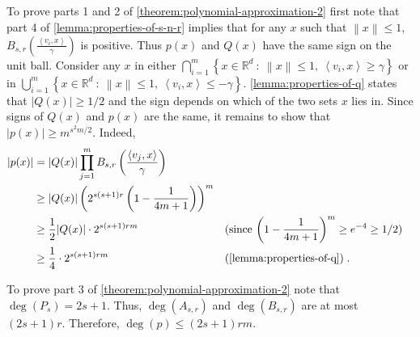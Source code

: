 \documentclass[12pt]{article}
\newcommand{\R}{\mathbb{R}}  %
\newcommand{\ip}[2]{\left\langle #1, #2 \right\rangle} %
\newcommand{\norm}[1]{\left\| #1 \right\|}  %
\begin{document}
To prove parts 1 and 2 of \autoref{theorem:polynomial-approximation-2} first
note that part 4 of \autoref{lemma:properties-of-s-n-r} implies that for any $x$
such that $\norm{x} \le 1$, $B_{s,r}\left( \frac{\ip{v_i}{x}}{\gamma} \right)$
is positive. Thus $p(x)$ and $Q(x)$ have the same sign on the unit ball.
Consider any $x$ in either
$\displaystyle \bigcap_{i=1}^m \left\{ x \in \R^d ~:~ \norm{x} \le 1, \ \ip{v_i}{x} \ge \gamma \right\}$
or in
$\displaystyle \bigcup_{i=1}^m \left\{ x \in \R^d ~:~ \norm{x} \le 1, \ \ip{v_i}{x} \le - \gamma \right\}$.
\autoref{lemma:properties-of-q} states that $|Q(x)| \ge 1/2$ and the sign
depends on which of the two sets $x$ lies in. Since signs of $Q(x)$ and $p(x)$
are the same, it remains to show that $|p(x)| \ge m^{s^2m/2}$. Indeed,
\begin{align*}
|p(x)|
& = |Q(x)| \prod_{j=1}^m B_{s,r} \left( \frac{\ip{v_j}{x}}{\gamma} \right) \\
& \ge |Q(x)| \left( 2^{s(s+1)r} \left( 1 - \frac{1}{4m+1} \right) \right)^m \\
& \ge \frac{1}{2} |Q(x)| \cdot 2^{s(s+1)rm} && \text{(since $\left(1-\frac{1}{4m+1}\right)^m \ge e^{-4} \ge 1/2$)} \\
& \ge \frac{1}{4} \cdot 2^{s(s+1)rm} && \text{(\autoref{lemma:properties-of-q})} \; .
\end{align*}

To prove part 3 of \autoref{theorem:polynomial-approximation-2} note that
$\deg(P_s) = 2s+1$. Thus, $\deg(A_{s,r})$ and $\deg(B_{s,r})$ are at most
$(2s+1)r$. Therefore, $\deg(p) \le (2s+1) rm$.
\end{document}
